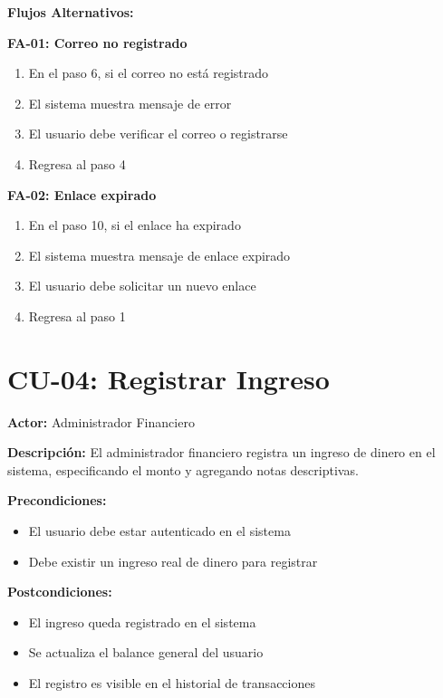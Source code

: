 \noindent\textbf{Flujos Alternativos:}

\textbf{FA-01: Correo no registrado}
\begin{enumerate}
    \item En el paso 6, si el correo no está registrado
    \item El sistema muestra mensaje de error
    \item El usuario debe verificar el correo o registrarse
    \item Regresa al paso 4
\end{enumerate}

\textbf{FA-02: Enlace expirado}
\begin{enumerate}
    \item En el paso 10, si el enlace ha expirado
    \item El sistema muestra mensaje de enlace expirado
    \item El usuario debe solicitar un nuevo enlace
    \item Regresa al paso 1
\end{enumerate}

\section{CU-04: Registrar Ingreso}

\noindent\textbf{Actor:} Administrador Financiero

\noindent\textbf{Descripción:} El administrador financiero registra un ingreso de dinero en el sistema, especificando el monto y agregando notas descriptivas.

\noindent\textbf{Precondiciones:}
\begin{itemize}
    \item El usuario debe estar autenticado en el sistema
    \item Debe existir un ingreso real de dinero para registrar
\end{itemize}

\noindent\textbf{Postcondiciones:}
\begin{itemize}
    \item El ingreso queda registrado en el sistema
    \item Se actualiza el balance general del usuario
    \item El registro es visible en el historial de transacciones
\end{itemize}

